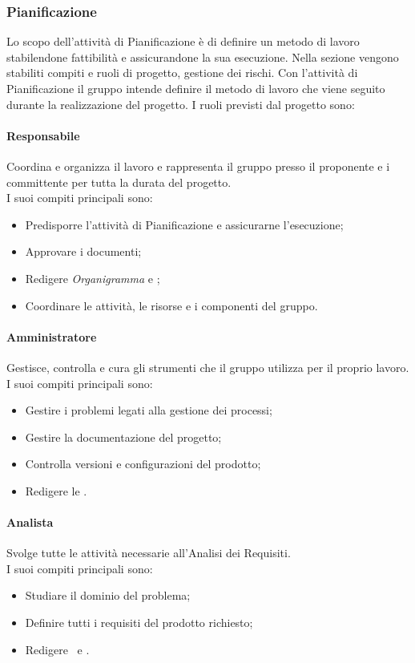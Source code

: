 \subsubsection{Pianificazione}
Lo scopo dell'attività di Pianificazione è di definire un metodo di lavoro stabilendone fattibilità e assicurandone la sua esecuzione.
Nella sezione vengono stabiliti compiti e ruoli di progetto, gestione dei rischi. 
Con l'attività di Pianificazione il gruppo intende definire il metodo di lavoro che viene seguito durante la realizzazione del progetto.
I ruoli previsti dal progetto sono:
\paragraph*{Responsabile}
Coordina e organizza il lavoro e rappresenta il gruppo presso il proponente e i committente per tutta la durata del progetto. \\
I suoi compiti principali sono:
\begin{itemize}
	\item Predisporre l'attività di Pianificazione e assicurarne l'esecuzione;
	\item Approvare i documenti;
	\item Redigere \textit{Organigramma} e \PdPv;
	\item Coordinare le attività, le risorse e i componenti del gruppo.
\end{itemize}

\paragraph*{Amministratore}
Gestisce, controlla e cura gli strumenti che il gruppo utilizza per il proprio lavoro. \\
I suoi compiti principali sono:
\begin{itemize}
	\item Gestire i problemi legati alla gestione dei processi;
	\item Gestire la documentazione del progetto;
	\item Controlla versioni e configurazioni del prodotto;
	\item Redigere le \NdPv.
\end{itemize}

\paragraph*{Analista}
Svolge tutte le attività necessarie all'Analisi dei Requisiti.\\
I suoi compiti principali sono:
\begin{itemize}
	\item Studiare il dominio del problema;
	\item Definire tutti i requisiti del prodotto richiesto;
	\item Redigere \SdFv\ e \AdRv.
\end{itemize}

